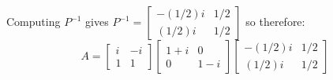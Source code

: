 \documentclass{article}
\begin{document}
\begin{itemize}
Computing \(P^{-1}\) gives \(P^{-1} = \begin{bmatrix} -(1/2)i & 1/2 \\ (1/2)i & 1/2 \end{bmatrix}\) so therefore: 
\[A = \begin{bmatrix} i & -i \\ 1 & 1 \end{bmatrix}\begin{bmatrix} 1 + i & 0 \\ 0 & 1 - i \end{bmatrix}\begin{bmatrix} -(1/2)i & 1/2 \\ (1/2)i & 1/2 \end{bmatrix}\]
\end{itemize}
\end{document}
